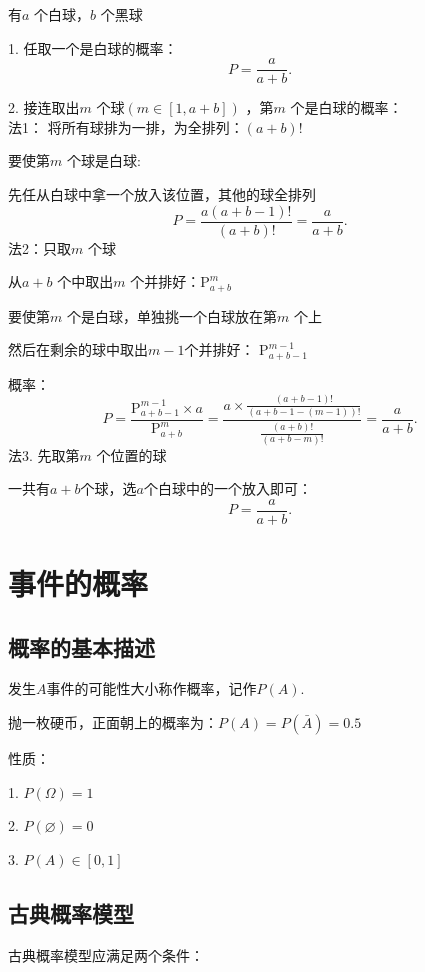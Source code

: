 \begin{eg}
    有$a$ 个白球，$b$ 个黑球

    1. 任取一个是白球的概率：
    \[
        P=\frac{a}{a+b}
    .\] 

    2. 接连取出$m$ 个球$\left( m\in \left[ 1,a+b \right]  \right) $ ，第$m$ 个是白球的概率：\\
    法1： 将所有球排为一排，为全排列：$\left( a+b \right) !$ 
    
    要使第$m$ 个球是白球:

    先任从白球中拿一个放入该位置，其他的球全排列
    \[
        P=\frac{a\left( a+b-1 \right) !}{\left( a+b \right) !}=\frac{a}{a+b}
    .\] 
    法2：只取$m$ 个球

    从$a+b$ 个中取出$m$ 个并排好：$\mathrm{P}_{a+b}^{m}$

    要使第$m$ 个是白球，单独挑一个白球放在第$m$ 个上

    然后在剩余的球中取出$m-1$个并排好： $\mathrm{P}_{a+b-1}^{m-1}$ 

    概率：
    \[
        P=\frac{\mathrm{P}_{a+b-1}^{m-1}\times a}{\mathrm{P}_{a+b}^{m}}=\frac{a\times \frac{\left( a+b-1 \right) !}{\left( a+b-1-\left( m-1 \right)  \right) !}}{\frac{\left( a+b \right) !}{\left( a+b-m \right) !}}=\frac{a}{a+b}
    .\] 
    法3. 先取第$m$ 个位置的球

    一共有$a+b$个球，选$a$个白球中的一个放入即可：
    \[
        P=\frac{a}{a+b}
    .\] 
\end{eg}
\section{事件的概率}%
\label{sec:事件的概率}

\subsection{概率的基本描述}%
\label{sub:概率的基本描述}
发生$A$事件的可能性大小称作概率，记作$P\left( A \right) $.
\begin{eg}
   抛一枚硬币，正面朝上的概率为：$P\left( A \right) =P\left( \bar{A} \right) = 0.5$
\end{eg}
性质：

1. $P\left( \Omega \right) =1$ 

2. $P\left( \varnothing \right) =0$ 

3. $P\left( A \right) \in [0,1]$

\subsection{古典概率模型}%
\label{sub:古典概率模型}
古典概率模型应满足两个条件：

